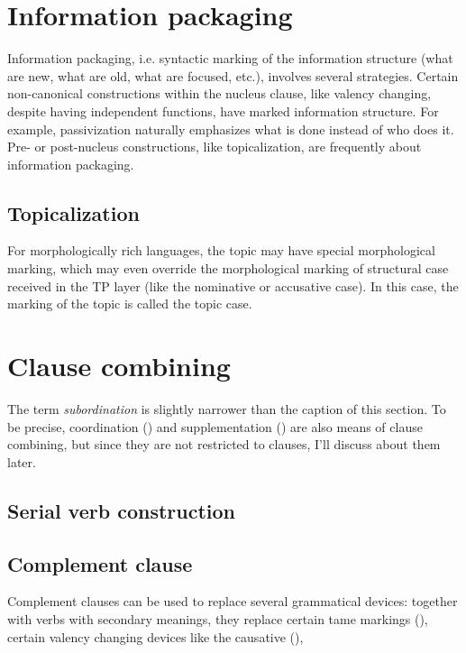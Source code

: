 \documentclass[UTF8, a4paper, oneside, scheme=plain]{ctexart}
\newcommand*{\term}[1]{\emph{#1}}
\begin{document}
\section{Information packaging}

Information packaging, i.e. syntactic marking of the information structure
(what are new, what are old, what are focused, etc.),
involves several strategies.
Certain non-canonical constructions within the nucleus clause, 
like valency changing, 
despite having independent functions,
have marked information structure.
For example, passivization naturally emphasizes what is done instead of who does it.
Pre- or post-nucleus constructions,
like topicalization, 
are frequently about information packaging.


\subsection{Topicalization}

For morphologically rich languages,
the topic may have special morphological marking,
which may even override the morphological marking of structural case received in the TP layer 
(like the nominative or accusative case).
In this case,
the marking of the topic is called the topic case.

\section{Clause combining}

The term \term{subordination} is slightly narrower than the caption of this section.
To be precise,
coordination () and supplementation () 
are also means of clause combining,
but since they are not restricted to clauses,
I'll discuss about them later.

\subsection{Serial verb construction}

\subsection{Complement clause}\label{sec:complement-clause}

Complement clauses can be used to replace several grammatical devices:
together with verbs with secondary meanings, 
they replace certain \ac{tame} markings (),
certain valency changing devices like the causative (),
\end{document}
